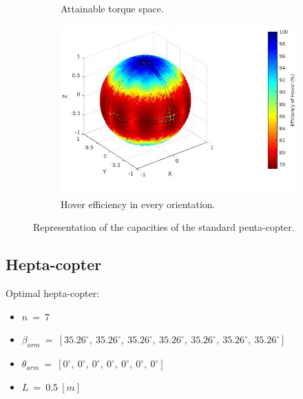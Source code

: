 {\begin{figure}[!ht]
{\begin{subfigure}[b]{0.5\textwidth}
    \caption{Attainable torque space.} \label{fig:penta_standard_tspace}
  \end{subfigure}
  \begin{subfigure}[b]{0.45\textwidth}
    \includegraphics[width=\linewidth]{images/Penta_standard_hspace.jpg}
    \caption{Hover efficiency in every orientation.} \label{fig:penta_standard_hspace}
  \end{subfigure}}
  \caption{Representation of the capacities of the standard penta-copter.}
  \label{fig:penta_standard_spaces}
\end{figure}

\subsection{Hepta-copter}
\label{sec:hepta_copter}

Optimal hepta-copter:

\begin{itemize}
  \item $n\ =\ 7$
  \item $\beta_{arm}\ =\ [35.26^{\circ},\  35.26^{\circ},\  35.26^{\circ},\  35.26^{\circ},\
                          35.26^{\circ},\  35.26^{\circ},\  35.26^{\circ}]$
  \item $\theta_{arm}\ =\ [0^{\circ},\  0^{\circ},\  0^{\circ},\  0^{\circ},\  0^{\circ},\
                            0^{\circ},\  0^{\circ}]$
  \item $L\ =\ 0.5\ [m]$
\end{itemize}

}

